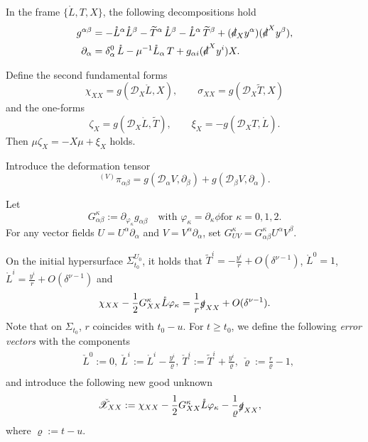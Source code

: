 \documentclass[11pt,twoside]{article}
\def\vp{\varphi}
\def\f{\frac}
\begin{document}
In the frame $\{\mathring L,T,X\}$, the following decompositions hold
\begin{align}
g^{\alpha\beta} &= -\mathring L^\alpha\mathring L^\beta -\widetilde T^\alpha\,\mathring L^\beta -\mathring L^\alpha\,\widetilde T^\beta +(\slashed d_X y^\alpha)(\slashed d^X y^\beta), \label{gab}\\ \partial_\alpha &= \delta_\alpha^0\,\mathring L -\mu^{-1}\mathring L_\alpha\,T + g_{\alpha i}(\slashed d^X y^i)X. \label{pal}
\end{align}

Define the second fundamental forms
\[
\chi_{XX} = g(\mathscr D_X\mathring L,X), \qquad \sigma_{XX} = g(\mathscr D_X\widetilde T,X)
\]
and the one-forms
\[
\zeta_X = g(\mathscr D_X\mathring L,\widetilde T), \qquad \xi_X = -g(\mathscr D_X T,\mathring L).
\]
Then $\mu \zeta_X = -X\mu + \xi_X$ holds.




Introduce the deformation tensor
\begin{equation}\label{dt}
 {}^{(V)}\pi_{\alpha\beta} = g(\mathscr{D}_{\alpha} V, \partial_{\beta}) + g(\mathscr{D}_{\beta} V, \partial_{\alpha}).
\end{equation}

Let
\[
G_{\alpha\beta}^{\kappa} := \partial_{\varphi_\kappa} g_{\alpha\beta}\quad\text{with $\varphi_\kappa=\partial_\kappa\phi$
for $\kappa=0,1,2$.}
\]
For any vector fields $U = U^{\alpha} \partial_{\alpha}$ and $V = V^{\alpha} \partial_{\alpha}$, set
$G_{UV}^{\kappa} = G_{\alpha\beta}^{\kappa} U^{\alpha} V^{\beta}$.

On the initial hypersurface $\Sigma_{t_0}^{U_0}$, it holds that $\tilde T^i=-\f{y^i}{r}+O(\delta^{\nu-1})$,
$\mathring L^0=1$, $\mathring L^i=\f{y^i}{r}+O(\delta^{\nu-1})$ and
\begin{equation}\label{YHCC5}
 \chi_{XX}-\f12G_{XX}^\kappa\mathring L\vp_\kappa=\f1r\slashed g_{XX}+O(\delta^{\nu-1}).
\end{equation}
Note that on $\Sigma_{t_0}$, $r$ coincides with $t_0-u$. For $t\geq t_0$, we define the following \textit{error vectors} with the components
\begin{equation}\label{errorv}
\begin{split}
&\check{L}^0:=0,\ \check{L}^i:=\mathring L^i-\f{y^i}{\varrho},\ \check{T}^i:=\tilde T^i+\f{y^i}{\varrho},\ \check\varrho:=\f{r}{\varrho}-1,\\
\end{split}
\end{equation}
and introduce the following new good unknown
\begin{equation}\label{errorv-1}
\begin{split}
&\check{\mathscr{X}}_{XX}:=\chi_{XX}- \frac{1}{2}G_{XX}^\kappa\mathring{L}\vp_\kappa-\f{1}{\varrho}\slashed g_{XX},
\end{split}
\end{equation}
where $\varrho:={t}-u$.
\end{document}

